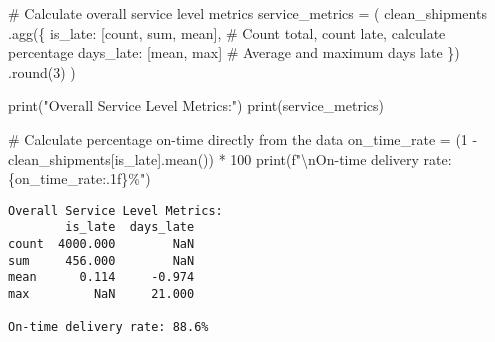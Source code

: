 \documentclass[
  letterpaper,
  DIV=11,
  numbers=noendperiod]{scrartcl}
\newenvironment{Shaded}{\begin{snugshade}}{\end{snugshade}}
\newcommand{\BuiltInTok}[1]{\textcolor[rgb]{0.00,0.23,0.31}{#1}}
\newcommand{\CharTok}[1]{\textcolor[rgb]{0.13,0.47,0.30}{#1}}
\newcommand{\CommentTok}[1]{\textcolor[rgb]{0.37,0.37,0.37}{#1}}
\newcommand{\DecValTok}[1]{\textcolor[rgb]{0.68,0.00,0.00}{#1}}
\newcommand{\NormalTok}[1]{\textcolor[rgb]{0.00,0.23,0.31}{#1}}
\newcommand{\OperatorTok}[1]{\textcolor[rgb]{0.37,0.37,0.37}{#1}}
\newcommand{\SpecialCharTok}[1]{\textcolor[rgb]{0.37,0.37,0.37}{#1}}
\newcommand{\SpecialStringTok}[1]{\textcolor[rgb]{0.13,0.47,0.30}{#1}}
\newcommand{\StringTok}[1]{\textcolor[rgb]{0.13,0.47,0.30}{#1}}
\begin{document}
\label{mental-model-5-aggregate}
\begin{Shaded}
\begin{Highlighting}[]
\CommentTok{\# Calculate overall service level metrics}
\NormalTok{service\_metrics }\OperatorTok{=}\NormalTok{ (}
\NormalTok{    clean\_shipments}
\NormalTok{    .agg(\{}
        \StringTok{\textquotesingle{}is\_late\textquotesingle{}}\NormalTok{: [}\StringTok{\textquotesingle{}count\textquotesingle{}}\NormalTok{, }\StringTok{\textquotesingle{}sum\textquotesingle{}}\NormalTok{, }\StringTok{\textquotesingle{}mean\textquotesingle{}}\NormalTok{],  }\CommentTok{\# Count total, count late, calculate percentage}
        \StringTok{\textquotesingle{}days\_late\textquotesingle{}}\NormalTok{: [}\StringTok{\textquotesingle{}mean\textquotesingle{}}\NormalTok{, }\StringTok{\textquotesingle{}max\textquotesingle{}}\NormalTok{]  }\CommentTok{\# Average and maximum days late}
\NormalTok{    \})}
\NormalTok{    .}\BuiltInTok{round}\NormalTok{(}\DecValTok{3}\NormalTok{)}
\NormalTok{)}

\BuiltInTok{print}\NormalTok{(}\StringTok{"Overall Service Level Metrics:"}\NormalTok{)}
\BuiltInTok{print}\NormalTok{(service\_metrics)}

\CommentTok{\# Calculate percentage on{-}time directly from the data}
\NormalTok{on\_time\_rate }\OperatorTok{=}\NormalTok{ (}\DecValTok{1} \OperatorTok{{-}}\NormalTok{ clean\_shipments[}\StringTok{\textquotesingle{}is\_late\textquotesingle{}}\NormalTok{].mean()) }\OperatorTok{*} \DecValTok{100}
\BuiltInTok{print}\NormalTok{(}\SpecialStringTok{f"}\CharTok{\textbackslash{}n}\SpecialStringTok{On{-}time delivery rate: }\SpecialCharTok{\{}\NormalTok{on\_time\_rate}\SpecialCharTok{:.1f\}}\SpecialStringTok{\%"}\NormalTok{)}
\end{Highlighting}
\end{Shaded}

\begin{verbatim}
Overall Service Level Metrics:
        is_late  days_late
count  4000.000        NaN
sum     456.000        NaN
mean      0.114     -0.974
max         NaN     21.000

On-time delivery rate: 88.6%
\end{verbatim}
\end{document}
